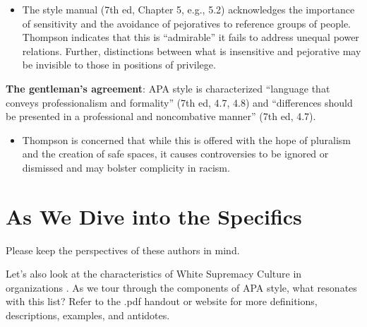 \documentclass[
  11pt,
]{book}
\providecommand{\tightlist}{%
  \setlength{\itemsep}{0pt}\setlength{\parskip}{0pt}}
\begin{document}
\begin{itemize}
\tightlist
\item
  The style manual (7th ed, Chapter 5, e.g., 5.2) acknowledges the importance of sensitivity and the avoidance of pejoratives to reference groups of people. Thompson indicates that this is ``admirable'' it fails to address unequal power relations. Further, distinctions between what is insensitive and pejorative may be invisible to those in positions of privilege.
\end{itemize}

\textbf{The gentleman's agreement}: APA style is characterized ``language that conveys professionalism and formality'' (7th ed, 4.7, 4.8) and ``differences should be presented in a professional and noncombative manner'' (7th ed, 4.7).

\begin{itemize}
\tightlist
\item
  Thompson \citeyearpar{thompson_gentlemanly_2004} is concerned that while this is offered with the hope of pluralism and the creation of safe spaces, it causes controversies to be ignored or dismissed and may bolster complicity in racism.
\end{itemize}

\hypertarget{as-we-dive-into-the-specifics}{%
\section{As We Dive into the Specifics}\label{as-we-dive-into-the-specifics}}

Please keep the perspectives of these authors in mind.

Let's also look at the characteristics of White Supremacy Culture in organizations \citep{noauthor_white_nodate}. As we tour through the components of APA style, what resonates with this list? Refer to the .pdf handout or website for more definitions, descriptions, examples, and antidotes.
\end{document}
